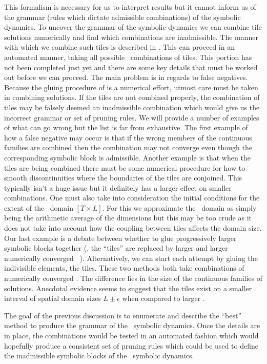 This formalism is necessary for us to interpret results but
it cannot inform us of the grammar (rules which dictate admissible combinations)
of the symbolic dynamics. To uncover the grammar of the
symbolic dynamics we can combine tile solutions numerically
and find which combinations are inadmissible. The manner
with which we combine such tiles is described in .
This can proceed in an automated manner, taking all possible
\spt\ combinations of tiles. This portion has not been
completed just yet and there are some key details
that must be worked out before we can proceed.
The main problem is in regards to false negatives. Because
the gluing procedure of  is a numerical
effort, utmost care must be taken in combining solutions.
If the tiles are not combined properly, the combination
of tiles may be falsely deemed an inadmissible combination
which would give us the incorrect grammar or set
of pruning rules. We will provide a number
of examples of what can go wrong but the list
is far from exhaustive. The first example of how a false negative may
occur is that if the wrong members of the continuous families
are combined then the combination may not converge even
though the corresponding symbolic block is admissible.
Another example is that when the tiles are being combined
there must be some numerical procedure for how to smooth
discontinuities where the boundaries of the tiles are conjoined.
This typically isn't a huge issue but it definitely has a larger effect
on smaller combinations. One must also take into consideration
the initial conditions for the extent of the \spt\ domain $[T\!\times\!L]$.
For this we approximate the \spt\ domain as simply being the
arithmetic average of the dimensions but this may be too crude
as it does not take into account how the coupling between tiles
affects the domain size. Our last example
is a debate between whether to
glue progressively larger symbolic blocks together (\ie, the ``tiles''
are replaced by larger and larger numerically converged \twots\ ).
Alternatively, we can start each attempt by gluing the
indivisible elements, the tiles. These two methods both
take combinations of numerically converged \twots. The
difference lies in the size of the continuous families of solutions.
Anecdotal evidence seems to suggest that
the tiles exist on a smaller interval of spatial
domain sizes $L \pm \epsilon$ when compared to
larger \twots.

The goal of the previous discussion is to enumerate
and describe the ``best'' method to produce the grammar
of the \spt\ symbolic dynamics. Once the details are
in place, the combinations would be tested in an automated
fashion which would hopefully produce a consistent
set of pruning rules which could be used to define
the inadmissible symbolic blocks of the \spt\
symbolic dynamics.

\renewcommand{\shift}{\ensuremath{d}}
\renewcommand{\Xx}{\ensuremath{\mathsf{X}}}
